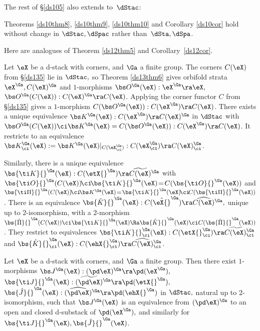 \documentclass{article}
\begin{document}
The rest of \S\ref{ds105} also extends to~$\dStac$:

\begin{thm} Theorems\/ {\rm\ref{ds10thm8}, \ref{ds10thm9},
\ref{ds10thm10}} and Corollary {\rm\ref{ds10cor}} hold without
change in\/ $\dStac,\dSpac$ rather than\/~$\dSta,\dSpa$.
\label{ds13thm7}
\end{thm}

Here are analogues of Theorem \ref{ds12thm5} and
Corollary~\ref{ds12cor}.

\begin{thm} Let\/ $\eX$ be a d-stack with corners, and\/ $\Ga$ a
finite group. The corners $C(\eX)$ from {\rm\S\ref{ds135}} lie in
$\dStac,$ so Theorem\/ {\rm\ref{ds13thm6}} gives orbifold strata
$\eX^\Ga,C(\eX)^\Ga$ and\/ $1$-morphisms $\bs
O^\Ga(\eX):\eX^\Ga\ra\eX,$ $\bs O^\Ga(C(\eX)):C(\eX)^\Ga\ra C(\eX)$.
Applying the corner functor $C$ from {\rm\S\ref{ds135}} gives a
$1$-morphism $C(\bs O^\Ga(\eX)):C(\eX^\Ga)\ra C(\eX)$. There exists
a unique equivalence $\bs K^\Ga(\eX):C(\eX^\Ga)\ra C(\eX)^\Ga$ in
$\dStac$ with\/ $\bs O^\Ga(C(\eX))\ci \bs K^\Ga(\eX)=C(\bs
O^\Ga(\eX)):C(\eX^\Ga)\ra C(\eX)$. It restricts to an equivalence
$\bs K^\Ga_\ci(\eX):=\bs K^\Ga(\eX)\vert_{\smash{C(\eX_\ci^\Ga)
}}:C(\eX^\Ga_\ci)\ra C(\eX)^\Ga_\ci$.

Similarly, there is a unique equivalence $\bs{\ti K}{}^\Ga(\eX):
C(\etX{}^\Ga)\ra\,\,\,\widetilde{\!\!\!C(\eX)\!\!\!}\,\,\,^\Ga$
with\/ $\bs{\ti O}{}^\Ga(C(\eX))\!\ci\!\bs{\ti K}{}^\Ga(\eX)\!=\!
C(\bs{\ti O}{}^\Ga(\eX))$ and\/ $\bs{\ti\Pi}{}^\Ga(C(\eX))\!\ci\!\bs
K{}^\Ga(\eX)\!=\!\bs{\ti K}{}^\Ga(\eX)\!\ci\!
C(\bs{\ti\Pi}{}^\Ga(\eX))$. There is an equivalence\/ $\bs{\hat
K}{}^\Ga(\eX):C(\hat\eX{}^\Ga) \ra \,\,\,\widehat{\!\!\!
C(\eX)\!\!\!}\,\,\,^\Ga,$ unique up to $2$-isomorphism, with a
$2$-morphism $\bs{\hat\Pi}{}^\Ga(C(\eX))\ci\bs{\ti
K}{}^\Ga(\eX)\Ra\bs{\hat K}{}^\Ga(\eX)\ci
C(\bs{\hat\Pi}{}^\Ga(\eX))$. They restrict to equivalences $\bs{\ti
K}{}^\Ga_\ci(\eX):C(\etX{}^\Ga_\ci)\ra\,\,\,\widetilde{\!\!\!
C(\eX)\!\!\!}\,\,\,^\Ga_\ci$ and\/ $\bs{\hat K}{}^\Ga_\ci(\eX):
C(\ehX{}^\Ga_\ci)\ra \,\,\,\widehat{\!\!\!
C(\eX)\!\!\!}\,\,\,^\Ga_\ci$.
\label{ds13thm8}
\end{thm}

\begin{cor} Let\/ $\eX$ be a d-stack with corners, and\/ $\Ga$ a
finite group. Then there exist\/ $1$-morphisms $\bs
J{}^\Ga(\eX):(\pd\eX)^\Ga\ra \pd(\eX^\Ga),$ $\bs{\ti J}{}^\Ga(\eX):
\,\,\,\,\widetilde{\!\!\!\!(\pd\eX)\!\!\!\!}\,\,\,\,^\Ga\ra
\pd(\etX{}^\Ga),$ $\bs{\hat J}{}^\Ga(\eX):\,\,\,\,\widehat{\!\!\!\!
(\pd\eX)\!\!\!\!}\,\,\,\,^\Ga\ra\pd(\ehX{}^\Ga)$ in\/ $\dStac,$
natural up to\/ $2$-isomorphism, such that\/ $\bs J{}^\Ga(\eX)$ is
an equivalence from $(\pd\eX)^\Ga$ to an open and closed d-substack
of\/ $\pd(\eX^\Ga),$ and similarly for\/~$\bs{\ti
J}{}^\Ga(\eX),\bs{\hat J}{}^\Ga(\eX)$.
\label{ds13cor}
\end{cor}
\end{document}
